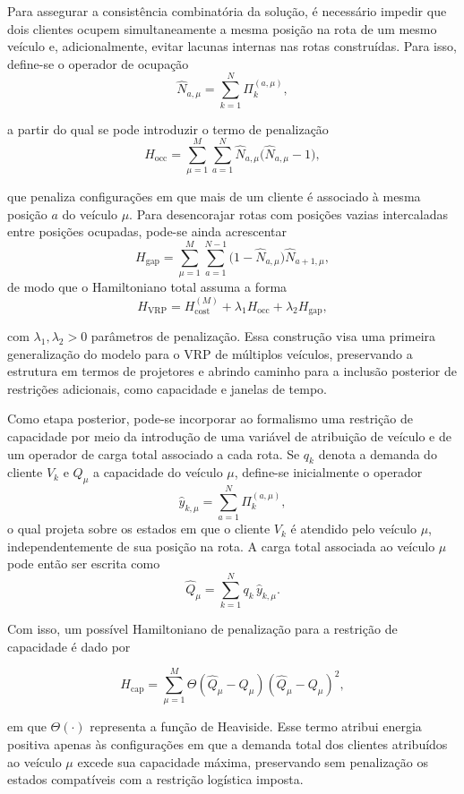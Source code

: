     Para assegurar a consistência combinatória da solução, é necessário impedir que dois clientes ocupem simultaneamente a mesma posição na rota de um mesmo veículo e, adicionalmente, evitar lacunas internas nas rotas construídas. Para isso, define-se o operador de ocupação
    $$
    \hat{N}_{a,\mu}=\sum_{k=1}^{N}\Pi_k^{(a,\mu)},
    $$

    \noindent a partir do qual se pode introduzir o termo de penalização
    $$
    H_{\mathrm{occ}}
    =
    \sum_{\mu=1}^{M}\sum_{a=1}^{N}
    \hat{N}_{a,\mu}\bigl(\hat{N}_{a,\mu}-1\bigr),
    $$

    \noindent que penaliza configurações em que mais de um cliente é associado à mesma posição $a$ do veículo $\mu$. Para desencorajar rotas com posições vazias intercaladas entre posições ocupadas, pode-se ainda acrescentar
    $$
    H_{\mathrm{gap}}
    =
    \sum_{\mu=1}^{M}\sum_{a=1}^{N-1}
    \bigl(1-\hat{N}_{a,\mu}\bigr)\hat{N}_{a+1,\mu},
    $$
    \noindent de modo que o Hamiltoniano total assuma a forma
    $$
    H_{\mathrm{VRP}}
    =
    H_{\mathrm{cost}}^{(M)}
    +\lambda_{1}H_{\mathrm{occ}}
    +\lambda_{2}H_{\mathrm{gap}},
    $$

    \noindent com $\lambda_1,\lambda_2>0$ parâmetros de penalização. Essa construção visa uma primeira generalização do modelo para o VRP de múltiplos veículos, preservando a estrutura em termos de projetores e abrindo caminho para a inclusão posterior de restrições adicionais, como capacidade e janelas de tempo.

    Como etapa posterior, pode-se incorporar ao formalismo uma restrição de capacidade por meio da introdução de uma variável de atribuição de veículo e de um operador de carga total associado a cada rota. Se $q_k$ denota a demanda do cliente $V_k$ e $Q_\mu$ a capacidade do veículo $\mu$, define-se inicialmente o operador
    $$
    \hat{y}_{k,\mu}=\sum_{a=1}^{N}\Pi_k^{(a,\mu)},
    $$
    o qual projeta sobre os estados em que o cliente $V_k$ é atendido pelo veículo $\mu$, independentemente de sua posição na rota. A carga total associada ao veículo $\mu$ pode então ser escrita como
    $$
    \hat{Q}_{\mu}=\sum_{k=1}^{N} q_k\,\hat{y}_{k,\mu}.
    $$

    Com isso, um possível Hamiltoniano de penalização para a restrição de capacidade é dado por

    $$
    H_{\mathrm{cap}}
    =
    \sum_{\mu=1}^{M}
    \Theta\!\left(\hat{Q}_{\mu}-Q_\mu\right)
    \left(\hat{Q}_{\mu}-Q_\mu\right)^2,
    $$

    \noindent em que $\Theta(\cdot)$ representa a função de Heaviside. Esse termo atribui energia positiva apenas às configurações em que a demanda total dos clientes atribuídos ao veículo $\mu$ excede sua capacidade máxima, preservando sem penalização os estados compatíveis com a restrição logística imposta.

